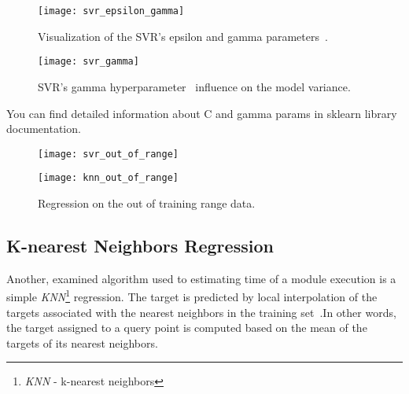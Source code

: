 \begin{figure}[!htb]
	\caption{Visualization of the SVR's epsilon and gamma parameters~.}
	\centering
	\label{fig:svr_epsilon_gamma}
	\texttt{[image: svr\_epsilon\_gamma]}
\end{figure}
\begin{figure}[!htb]
	\caption{SVR's gamma hyperparameter~ influence on the model variance.}
	\centering
	\label{fig:gamma}
	\texttt{[image: svr\_gamma]}
\end{figure}
You can find detailed information about C and gamma params in sklearn library documentation\cite{rbf_params}.

\begin{figure*}[!t]
	\centering
	\begin{minipage}{0.45\linewidth}
		\texttt{[image: svr\_out\_of\_range]}
	\end{minipage}
	\begin{minipage}{0.45\linewidth}
		\texttt{[image: knn\_out\_of\_range]}
	\end{minipage}
	\caption{Regression on the out of training range data.}
	\label{fig:out_of_range}
\end{figure*}

\subsection{K-nearest Neighbors Regression}

Another, examined algorithm used to estimating time of a module execution is a simple \textit{KNN}\footnote{\textit{KNN} - k-nearest neighbors} regression. The target is predicted by local interpolation of the targets associated with the nearest neighbors in the training set~\cite{knnreg}.In other words, the target assigned to a query point is computed based on the mean of the targets of its nearest neighbors.

